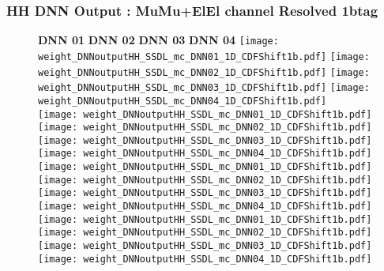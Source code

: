 \documentclass[9pt]{beamer}
\begin{document}
\begin{frame}
	\frametitle{HH DNN Output : MuMu+ElEl channel Resolved 1btag}
	\begin{figure}
	    \textbf{DNN 01} \hspace{1.2cm} \textbf{DNN 02} \hspace{1.2cm} \textbf{DNN 03} \hspace{1.2cm} \textbf{DNN 04}
        \centering
		\texttt{[image: weight\_DNNoutputHH\_SSDL\_mc\_DNN01\_1D\_CDFShift1b.pdf]}
		\texttt{[image: weight\_DNNoutputHH\_SSDL\_mc\_DNN02\_1D\_CDFShift1b.pdf]}
		\texttt{[image: weight\_DNNoutputHH\_SSDL\_mc\_DNN03\_1D\_CDFShift1b.pdf]}
		\texttt{[image: weight\_DNNoutputHH\_SSDL\_mc\_DNN04\_1D\_CDFShift1b.pdf]}\\
		\texttt{[image: weight\_DNNoutputHH\_SSDL\_mc\_DNN01\_1D\_CDFShift1b.pdf]}
		\texttt{[image: weight\_DNNoutputHH\_SSDL\_mc\_DNN02\_1D\_CDFShift1b.pdf]}
		\texttt{[image: weight\_DNNoutputHH\_SSDL\_mc\_DNN03\_1D\_CDFShift1b.pdf]}
		\texttt{[image: weight\_DNNoutputHH\_SSDL\_mc\_DNN04\_1D\_CDFShift1b.pdf]}\\
		\texttt{[image: weight\_DNNoutputHH\_SSDL\_mc\_DNN01\_1D\_CDFShift1b.pdf]}
		\texttt{[image: weight\_DNNoutputHH\_SSDL\_mc\_DNN02\_1D\_CDFShift1b.pdf]}
		\texttt{[image: weight\_DNNoutputHH\_SSDL\_mc\_DNN03\_1D\_CDFShift1b.pdf]}
		\texttt{[image: weight\_DNNoutputHH\_SSDL\_mc\_DNN04\_1D\_CDFShift1b.pdf]}\\
		\texttt{[image: weight\_DNNoutputHH\_SSDL\_mc\_DNN01\_1D\_CDFShift1b.pdf]}
		\texttt{[image: weight\_DNNoutputHH\_SSDL\_mc\_DNN02\_1D\_CDFShift1b.pdf]}
		\texttt{[image: weight\_DNNoutputHH\_SSDL\_mc\_DNN03\_1D\_CDFShift1b.pdf]}
		\texttt{[image: weight\_DNNoutputHH\_SSDL\_mc\_DNN04\_1D\_CDFShift1b.pdf]}\\
	\end{figure}
\end{frame}
\end{document}
